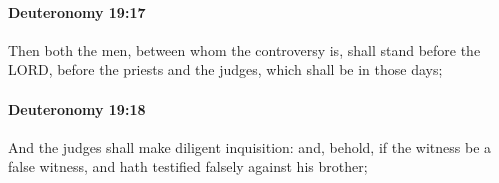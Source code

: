 		\paragraph{Deuteronomy 19:17} %
			\label{DEUTERONOMY-19-17}

			Then both the men, between whom the controversy is, shall stand before the LORD, before the priests and the judges, which shall be in those days;


		\paragraph{Deuteronomy 19:18} %
			\label{DEUTERONOMY-19-18}

			And the judges shall make diligent inquisition: and, behold, if the witness be a false witness, and hath testified falsely against his brother;


